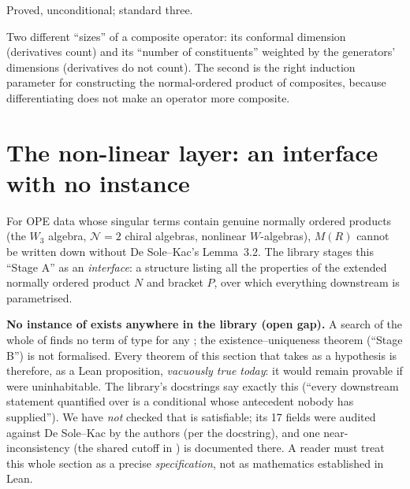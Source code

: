 \begin{status}
Proved, unconditional; standard three.
\end{status}

\begin{physics}
Two different ``sizes'' of a composite operator: its conformal dimension (derivatives count) and its ``number of constituents''
weighted by the generators' dimensions (derivatives do not count). The second is the right induction parameter for constructing the
normal-ordered product of composites, because differentiating does not make an operator more composite.
\end{physics}


\section{The non-linear layer: an interface with no instance}\label{l11:sec:doctrine}

For OPE data whose singular terms contain genuine normally ordered products (the $W_3$ algebra, $\mathcal N=2$ chiral
algebras, nonlinear $W$-algebras), $M(R)$ cannot be written down without De Sole--Kac's Lemma~3.2. The library stages
this ``Stage A'' as an \emph{interface}: a structure listing all the properties of the extended normally ordered product
$N$ and bracket $P$, over which everything downstream is parametrised.

\begin{warning}
\textbf{No instance of  exists anywhere in the library (open gap).} A search of the whole of 
finds no term of type  for any ; the existence--uniqueness theorem (``Stage B'') is not
formalised. Every theorem of this section that takes  as a hypothesis is therefore, as a Lean
proposition, \emph{vacuously true today}: it would remain provable if  were uninhabitable. The library's
docstrings say exactly this (``every downstream statement quantified over  is a conditional whose
antecedent nobody has supplied''). We have \emph{not} checked that  is satisfiable; its 17 fields were
audited against De Sole--Kac by the authors (per the docstring), and one near-inconsistency (the shared cutoff in
) is documented there. A reader must treat this whole section as a precise \emph{specification}, not as
mathematics established in Lean.
\end{warning}

